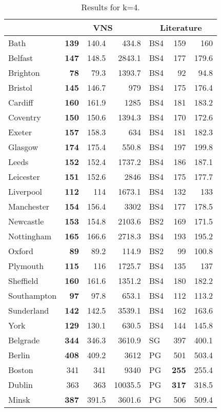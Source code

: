 \documentclass[dvipsnames,format=sigconf,anonymous=true,review=true]{acmart}
\begin{document}
\begin{table}
	\begin{tabular}{l|rrr|lrr}
		\hline
		\multicolumn{1}{c}{ } & \multicolumn{3}{|c}{VNS} & \multicolumn{3}{|c}{Literature} \\
		\hline
		Bath&\bf{139}&140.4&434.8&BS4&159&160\\
		Belfast&\bf{147}&148.5&2843.1&BS4&177&179.6\\
		Brighton&\bf{78}&79.3&1393.7&BS4&92&94.8\\
		Bristol&\bf{145}&146.7&979&BS4&175&176.4\\
		Cardiff&\bf{160}&161.9&1285&BS4&181&183.2\\
		Coventry&\bf{150}&150.6&1394.3&BS4&170&172.6\\
		Exeter&\bf{157}&158.3&634&BS4&181&182.3\\
		Glasgow&\bf{174}&175.4&550.8&BS4&197&199.8\\
		Leeds&\bf{152}&152.4&1737.2&BS4&186&187.1\\
		Leicester&\bf{151}&152.6&2846&BS4&175&177.7\\
		Liverpool&\bf{112}&114&1673.1&BS4&132&133\\
		Manchester&\bf{154}&156.4&3302&BS4&177&178.5\\
		Newcastle&\bf{153}&154.8&2103.6&BS2&169&171.5\\
		Nottingham&\bf{165}&166.6&2718.3&BS4&193&195.2\\
		Oxford&\bf{89}&89.2&114.9&BS2&99&100.8\\
		Plymouth&\bf{115}&116&1725.7&BS4&135&137\\
		Sheffield&\bf{160}&161.6&1351.2&BS4&180&182.2\\
		Southampton&\bf{97}&97.8&653.1&BS4&112&113.2\\
		Sunderland&\bf{142}&142.5&3539.1&BS4&162&163.6\\
		York&\bf{129}&130.1&630.5&BS4&144&145.8\\
		Belgrade&\bf{344}&346.3&3610.9&SG&397&400.1\\
		Berlin&\bf{408}&409.2&3612&PG&501&503.4\\
		Boston&341&341&9340&PG&\bf{255}&255.4\\
		Dublin&363&363&10035.5&PG&\bf{317}&318.5\\
		Minsk&\bf{387}&391.5&3601.6&PG&506&509.4\\
		
		\hline
		
	\end{tabular}
	\caption{Results for k=4.}
	\label{tab:k4}  
\end{table}
 
\end{document}
